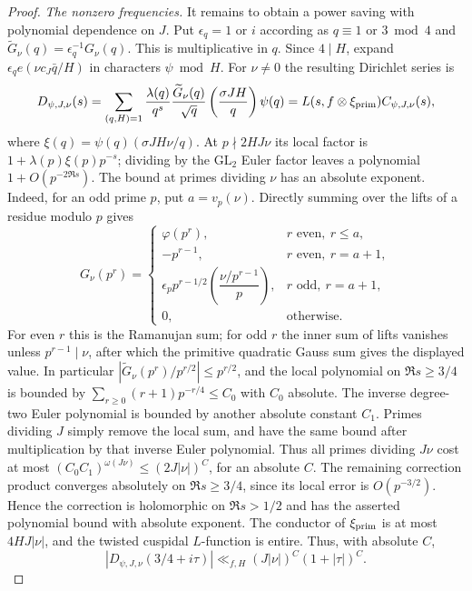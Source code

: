 \begin{proof}
\par\smallskip\noindent\emph{The nonzero frequencies.}
It remains to obtain a power saving with polynomial dependence on $J$.
Put $\epsilon_q=1$ or $i$ according as $q\equiv1$ or $3\bmod4$
and $\widetilde G_\nu(q)=\epsilon_q^{-1}G_\nu(q)$. This is multiplicative
in $q$. Since $4\mid H$, expand
$\epsilon_q e(\nu c_J\bar q/H)$ in characters $\psi\bmod H$.
For $\nu\ne0$ the resulting Dirichlet series is
\[
 D_{\psi,J,\nu}(s)=
 \sum_{(q,H)=1}\frac{\lambda(q)}{q^s}
 \frac{\widetilde G_\nu(q)}{\sqrt q}
 \left(\frac{\sigma JH}{q}\right)\psi(q)
 =L(s,f\otimes\xi_{\rm prim})C_{\psi,J,\nu}(s),
\]
where $\xi(q)=\psi(q)(\sigma JH\nu/q)$.
At $p\nmid2HJ\nu$ its local factor is
$1+\lambda(p)\xi(p)p^{-s}$; dividing by the $\mathrm{GL}_2$ Euler
factor leaves a polynomial $1+O(p^{-2\Re s})$.
The bound at primes dividing $\nu$ has an absolute exponent.
Indeed, for an odd prime $p$, put $a=v_p(\nu)$. Directly summing
over the lifts of a residue modulo $p$ gives
\[
G_\nu(p^r)=
\begin{cases}
 \varphi(p^r),&r\text{ even},\ r\le a,\\
 -p^{r-1},&r\text{ even},\ r=a+1,\\
 \epsilon_p p^{r-1/2}
       \left(\dfrac{\nu/p^{r-1}}p\right),
       &r\text{ odd},\ r=a+1,\\
 0,&\text{otherwise}.
\end{cases}
\]
For even $r$ this is the Ramanujan sum; for odd $r$ the inner
sum of lifts vanishes unless $p^{r-1}\mid\nu$, after which
the primitive quadratic Gauss sum gives the displayed value.
In particular
$|\widetilde G_\nu(p^r)/p^{r/2}|\le p^{r/2}$, and the local
polynomial on $\Re s\ge3/4$ is bounded by
$\sum_{r\ge0}(r+1)p^{-r/4}\le C_0$ with $C_0$ absolute.
The inverse degree-two Euler polynomial is bounded by another
absolute constant $C_1$. Primes dividing $J$ simply remove the
local sum, and have the same bound after multiplication by that
inverse Euler polynomial. Thus all primes dividing $J\nu$ cost
at most $(C_0C_1)^{\omega(J\nu)}\le (2J|\nu|)^C$, for an
absolute $C$. The remaining correction product converges
absolutely on $\Re s\ge3/4$, since its local error is
$O(p^{-3/2})$. Hence the correction is holomorphic on
$\Re s>1/2$ and has the asserted polynomial bound with absolute exponent.
The conductor of $\xi_{\rm prim}$ is at most $4HJ|\nu|$, and the
twisted cuspidal $L$-function is entire. Thus, with absolute $C$,
\[
 |D_{\psi,J,\nu}(3/4+i\tau)|
 \ll_{f,H}(J|\nu|)^C(1+|\tau|)^C.
\]


\end{proof}
